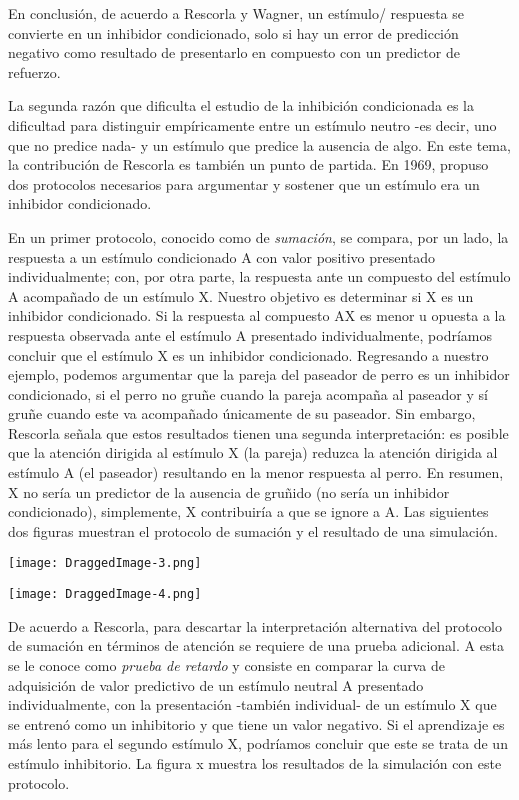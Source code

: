 \documentclass[
  a4paper,
  DIV=11,
  numbers=noendperiod]{scrreprt}
\begin{document}
En conclusión, de acuerdo a Rescorla y Wagner, un estímulo/ respuesta se
convierte en un inhibidor condicionado, solo si hay un error de
predicción negativo como resultado de presentarlo en compuesto con un
predictor de refuerzo.

La segunda razón que dificulta el estudio de la inhibición condicionada
es la dificultad para distinguir empíricamente entre un estímulo neutro
-es decir, uno que no predice nada- y un estímulo que predice la
ausencia de algo. En este tema, la contribución de Rescorla es también
un punto de partida. En 1969, propuso dos protocolos necesarios para
argumentar y sostener que un estímulo era un inhibidor condicionado.

En un primer protocolo, conocido como de \emph{sumación}, se compara,
por un lado, la respuesta a un estímulo condicionado A con valor
positivo presentado individualmente; con, por otra parte, la respuesta
ante un compuesto del estímulo A acompañado de un estímulo X. Nuestro
objetivo es determinar si X es un inhibidor condicionado. Si la
respuesta al compuesto AX es menor u opuesta a la respuesta observada
ante el estímulo A presentado individualmente, podríamos concluir que el
estímulo X es un inhibidor condicionado. Regresando a nuestro ejemplo,
podemos argumentar que la pareja del paseador de perro es un inhibidor
condicionado, si el perro no gruñe cuando la pareja acompaña al paseador
y sí gruñe cuando este va acompañado únicamente de su paseador. Sin
embargo, Rescorla señala que estos resultados tienen una segunda
interpretación: es posible que la atención dirigida al estímulo X (la
pareja) reduzca la atención dirigida al estímulo A (el paseador)
resultando en la menor respuesta al perro. En resumen, X no sería un
predictor de la ausencia de gruñido (no sería un inhibidor
condicionado), simplemente, X contribuiría a que se ignore a A. Las
siguientes dos figuras muestran el protocolo de sumación y el resultado
de una simulación.

\texttt{[image: DraggedImage-3.png]}

\texttt{[image: DraggedImage-4.png]}

De acuerdo a Rescorla, para descartar la interpretación alternativa del
protocolo de sumación en términos de atención se requiere de una prueba
adicional. A esta se le conoce como \emph{prueba de retardo} y consiste
en comparar la curva de adquisición de valor predictivo de un estímulo
neutral A presentado individualmente, con la presentación -también
individual- de un estímulo X que se entrenó como un inhibitorio y que
tiene un valor negativo. Si el aprendizaje es más lento para el segundo
estímulo X, podríamos concluir que este se trata de un estímulo
inhibitorio. La figura x muestra los resultados de la simulación con
este protocolo.
\end{document}
